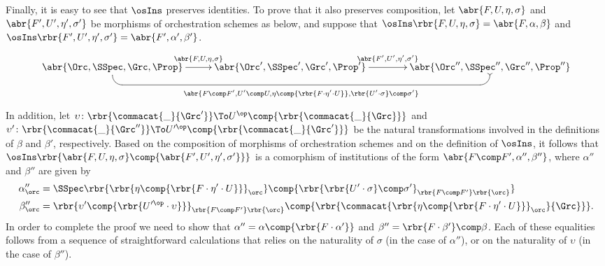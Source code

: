 \documentclass{LMCS}
\begin{document}
\noindent  Finally, it is easy to see that \(\osIns\) preserves identities.
  To prove that it also preserves composition, let \(\abr{F, U, \eta, \sigma}\) and \(\abr{F', U', \eta', \sigma'}\) be  morphisms of orchestration schemes as below, and suppose that \(\osIns\rbr{F, U, \eta, \sigma} = \abr{F, \alpha, \beta}\) and \(\osIns\rbr{F', U', \eta', \sigma'} = \abr{F', \alpha', \beta'}\).
  \[
  \xymatrix @C=0em @L+.5ex {
    {\abr{\Orc, \SSpec, \Grc, \Prop}}
    \ar [rr] ^-{\abr{F, U, \eta, \sigma}}
    \ar `d[rrrr] `[rrrr] _-{\abr{F \comp F', U' \comp U, \eta \comp {\rbr{F \cdot \eta' \cdot U}}, \rbr{U' \cdot \sigma} \comp \sigma'}} [rrrr]
    & \hspace{2em}
    & {\abr{\Orc', \SSpec', \Grc', \Prop'}}
    \ar [rr] ^-{\abr{F', U', \eta', \sigma'}}
    & \hspace{3.25em}
    & {\abr{\Orc'', \SSpec'', \Grc'', \Prop''}}
  }
  \]
  In addition, let \(\upsilon \colon \rbr{\commacat{\_}{\Grc'}} \To U^{\op} \comp {\rbr{\commacat{\_}{\Grc}}}\) and \(\upsilon' \colon \rbr{\commacat{\_}{\Grc''}} \To U^{\prime\op} \comp {\rbr{\commacat{\_}{\Grc'}}}\) be the natural transformations involved in the definitions of \(\beta\) and \(\beta'\), respectively.
  Based on the composition of morphisms of orchestration schemes and on the definition of \(\osIns\), it follows that \(\osIns\rbr{\abr{F, U, \eta, \sigma} \comp {\abr{F', U', \eta', \sigma'}}}\) is a comorphism of institutions of the form \(\abr{F \comp F', \alpha'', \beta''}\), where \(\alpha''\) and \(\beta''\) are given by
  \begin{align*}
    \alpha''_{\orc} & = \SSpec\rbr{\rbr{\eta \comp {\rbr{F \cdot \eta' \cdot U}}}_{\orc}} \comp {\rbr{\rbr{U' \cdot \sigma} \comp \sigma'}_{\rbr{F \comp F'}\rbr{\orc}}} \\
    \beta''_{\orc} & = \rbr{\upsilon' \comp {\rbr{U^{\prime\op} \cdot \upsilon}}}_{\rbr{F \comp F'}\rbr{\orc}} \comp {\rbr{\commacat{\rbr{\eta \comp {\rbr{F \cdot \eta' \cdot U}}}_{\orc}}{\Grc}}}.
  \end{align*}
  In order to complete the proof we need to show that \(\alpha'' = \alpha \comp {\rbr{F \cdot \alpha'}}\) and \(\beta'' = \rbr{F \cdot \beta'} \comp \beta\).
  Each of these equalities follows from a sequence of straightforward calculations that relies on the naturality of \(\sigma\) (in the case of \(\alpha''\)), or on the naturality of \(\upsilon\) (in the case of \(\beta''\)).
\end{document}
